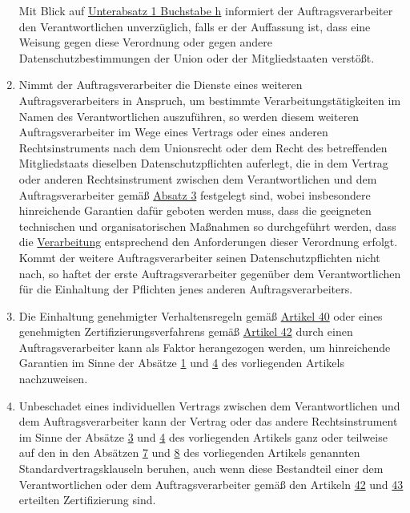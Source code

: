 \begin{enumerate}
\begin{enumerate}
  \end{enumerate}

  Mit Blick auf \hyperref[itm:28-3-1h]{Unterabsatz 1 Buchstabe h} informiert der Auftragsverarbeiter den
  Verantwortlichen
  unverzüglich, falls er der Auffassung ist, dass eine Weisung gegen diese Verordnung oder gegen andere
  Datenschutzbestimmungen der Union oder der Mitgliedstaaten verstößt.
  \label{itm:28-3-2}

  \item Nimmt der Auftragsverarbeiter die Dienste eines weiteren Auftragsverarbeiters in Anspruch, um bestimmte
   Verarbeitungstätigkeiten im Namen des Verantwortlichen auszuführen, so werden diesem weiteren Auftragsverarbeiter im
   Wege eines Vertrags oder eines anderen Rechtsinstruments nach dem Unionsrecht oder dem Recht des betreffenden
   Mitgliedstaats dieselben Datenschutzpflichten auferlegt, die in dem Vertrag oder anderen Rechtsinstrument zwischen
   dem Verantwortlichen und dem Auftragsverarbeiter gemäß \hyperref[itm:28-3-1]{Absatz 3} festgelegt sind, wobei
   insbesondere hinreichende Garantien dafür geboten werden muss, dass die geeigneten technischen und organisatorischen
   Maßnahmen so durchgeführt werden, dass die \hyperref[itm:04-2]{Verarbeitung} entsprechend den Anforderungen dieser Verordnung erfolgt.
   Kommt der weitere Auftragsverarbeiter seinen Datenschutzpflichten nicht nach, so haftet der erste
   Auftragsverarbeiter gegenüber dem Verantwortlichen für die Einhaltung der Pflichten jenes anderen
   Auftragsverarbeiters.
  \label{itm:28-4}

  \item Die Einhaltung genehmigter Verhaltensregeln gemäß \hyperref[ch:40]{Artikel 40} oder eines genehmigten
   Zertifizierungsverfahrens gemäß \hyperref[ch:42]{Artikel 42} durch einen Auftragsverarbeiter kann als Faktor
   herangezogen werden, um hinreichende Garantien im Sinne der Absätze \hyperref[itm:28-1]{1} und \hyperref[itm:28-4]
   {4} des vorliegenden Artikels nachzuweisen.
  \label{itm:28-5}

  \item Unbeschadet eines individuellen Vertrags zwischen dem Verantwortlichen und dem Auftragsverarbeiter kann der
   Vertrag oder das andere Rechtsinstrument im Sinne der Absätze \hyperref[itm:28-3-1]{3} und \hyperref[itm:28-4]{4} des
   vorliegenden Artikels ganz oder teilweise auf den in den Absätzen \hyperref[itm:28-7]{7} und \hyperref[itm:28-8]
   {8} des vorliegenden Artikels genannten Standardvertragsklauseln beruhen, auch wenn diese Bestandteil einer dem
   Verantwortlichen oder dem Auftragsverarbeiter gemäß den Artikeln \hyperref[ch:42]{42} und \hyperref[ch:43]{43}
   erteilten Zertifizierung sind.
  \label{itm:28-6}


\end{enumerate}
